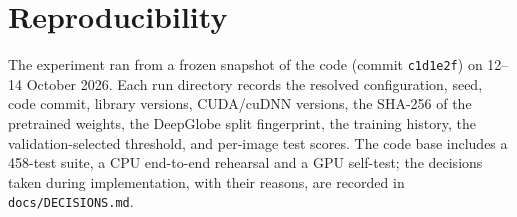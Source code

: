 \documentclass[11pt]{article}
\begin{document}
\section{Reproducibility}

The experiment ran from a frozen snapshot of the code (commit \texttt{c1d1e2f}) on 12--14 October
2026. Each run directory records the resolved configuration, seed, code commit, library versions,
CUDA/cuDNN versions, the SHA-256 of the pretrained weights, the DeepGlobe split fingerprint,
the training history, the validation-selected threshold, and per-image test scores. The code base
includes a 458-test suite, a CPU end-to-end rehearsal and a GPU self-test; the decisions taken
during implementation, with their reasons, are recorded in \texttt{docs/DECISIONS.md}.
\end{document}
